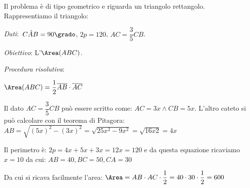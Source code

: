 Il problema è di tipo geometrico e riguarda un triangolo rettangolo.
Rappresentiamo il triangolo:

\begin{multicols}{2}

\emph{Dati}:~\(C\hat{{A}}B=90\grado\), \(2p= 120\), \(AC=\dfrac{3}{5}CB\).

\emph{Obiettivo}: L'\(\Area (ABC)\).

\emph{Procedura risolutiva}:

\hspace{10mm}
\(\Area (ABC) =\dfrac{1}{2}\overline{AB} \cdot \overline{AC}\)

\begin{center}
%  
\triangolo
\end{center}
\end{multicols}

Il dato \(AC=\dfrac{3}{5}CB\) può essere scritto come: \(AC=3x \wedge CB=5x\).
L'altro cateto si può calcolare con il teorema di Pitagora:
\(AB=\sqrt{(5x)^2-(3x)^2}=\sqrt{25x^2-9x^2}=\sqrt{16x2}=4x\)

Il perimetro è: \(2p=4x+5x+3x=12x=120\) e da questa equazione ricaviamo 
\(x=10\) da cui: \(AB=40, BC=50, CA=30\)

Da cui si ricava facilmente l'area: 
\(\Area=AB \cdot AC \cdot \dfrac{1}{2} = 
40 \cdot 30 \cdot \dfrac{1}{2} =600\)
